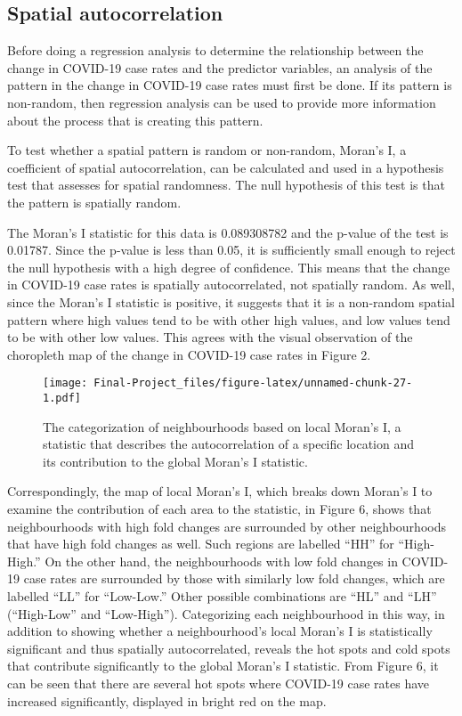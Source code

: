 \documentclass[]{article}
\begin{document}
\hypertarget{spatial-autocorrelation}{%
\subsection{Spatial autocorrelation}\label{spatial-autocorrelation}}

Before doing a regression analysis to determine the relationship between
the change in COVID-19 case rates and the predictor variables, an
analysis of the pattern in the change in COVID-19 case rates must first
be done. If its pattern is non-random, then regression analysis can be
used to provide more information about the process that is creating this
pattern.

To test whether a spatial pattern is random or non-random, Moran's I, a
coefficient of spatial autocorrelation, can be calculated and used in a
hypothesis test that assesses for spatial randomness. The null
hypothesis of this test is that the pattern is spatially random.

The Moran's I statistic for this data is 0.089308782 and the p-value of
the test is 0.01787. Since the p-value is less than 0.05, it is
sufficiently small enough to reject the null hypothesis with a high
degree of confidence. This means that the change in COVID-19 case rates
is spatially autocorrelated, not spatially random. As well, since the
Moran's I statistic is positive, it suggests that it is a non-random
spatial pattern where high values tend to be with other high values, and
low values tend to be with other low values. This agrees with the visual
observation of the choropleth map of the change in COVID-19 case rates
in Figure 2.

\begin{figure}
\centering
\texttt{[image: Final-Project\_files/figure-latex/unnamed-chunk-27-1.pdf]}
\caption{The categorization of neighbourhoods based on local Moran's I,
a statistic that describes the autocorrelation of a specific location
and its contribution to the global Moran's I statistic.}
\end{figure}

Correspondingly, the map of local Moran's I, which breaks down Moran's I
to examine the contribution of each area to the statistic, in Figure 6,
shows that neighbourhoods with high fold changes are surrounded by other
neighbourhoods that have high fold changes as well. Such regions are
labelled ``HH'' for ``High-High.'' On the other hand, the neighbourhoods
with low fold changes in COVID-19 case rates are surrounded by those
with similarly low fold changes, which are labelled ``LL'' for
``Low-Low.'' Other possible combinations are ``HL'' and ``LH''
(``High-Low'' and ``Low-High''). Categorizing each neighbourhood in this
way, in addition to showing whether a neighbourhood's local Moran's I is
statistically significant and thus spatially autocorrelated, reveals the
hot spots and cold spots that contribute significantly to the global
Moran's I statistic. From Figure 6, it can be seen that there are
several hot spots where COVID-19 case rates have increased
significantly, displayed in bright red on the map.
\end{document}
